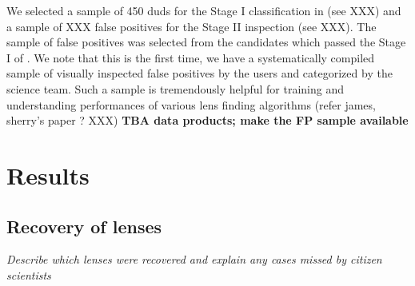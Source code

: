 \documentclass[useAMS,usenatbib,a4paper]{mn2e}
\begin{document}
We selected a sample of 450 duds for the Stage I classification in \sw
(see XXX) and a sample of XXX false positives for the Stage II
inspection (see XXX). The sample of false positives was selected from
the candidates which passed the Stage I of \sw. We note that this is the
first time, we have a systematically compiled sample of visually
inspected false positives by the \sw users and categorized by the
science team. Such a sample is tremendously helpful for training and
understanding performances of various lens finding algorithms (refer
james, sherry's paper ? XXX)
{\bf TBA data products; make the FP sample available}

\section{Results}
\label{sec:results}

\subsection{Recovery of lenses}
\label{sec:results:reco}

{\it Describe which lenses were recovered and explain any cases missed by
citizen scientists}
%
%
%
%
%
\end{document}
